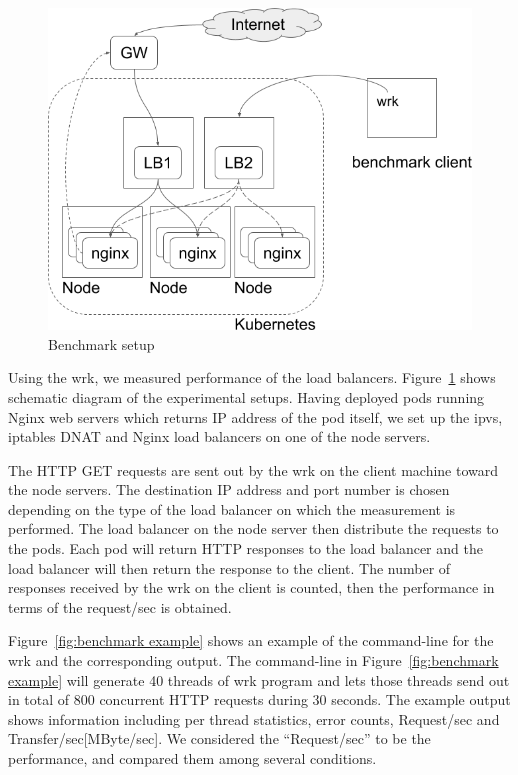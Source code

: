 \begin{figure}
\includegraphics[width=\columnwidth]{Figs/benchmark-schem}
\caption{Benchmark setup}
\label{fig:benchmark-schem}
\end{figure}

Using the wrk, we measured performance of the load balancers.
Figure~\ref{fig:benchmark-schem} shows schematic diagram of the experimental setups.
Having deployed pods running Nginx web servers which returns IP address of the pod itself,
we set up the ipvs, iptables DNAT and Nginx load balancers on one of the node servers. 

The HTTP GET requests are sent out by the wrk on the client machine toward the node servers.
The destination IP address and port number is chosen 
depending on the type of the load balancer on which the measurement is performed.
The load balancer on the node server then distribute the requests to the pods.
Each pod will return HTTP responses to the load balancer and the load balancer will then return the response to the client.
The number of responses received by the wrk on the client is counted, 
then the performance in terms of the request/sec is obtained. 

Figure~\ref{fig:benchmark example} shows an example of the command-line for the wrk and the corresponding output.
The command-line in Figure~\ref{fig:benchmark example} will generate 40 threads of wrk program 
and lets those threads send out in total of 800 concurrent HTTP requests during 30 seconds.
The example output shows information including per thread statistics, error counts, Request/sec and Transfer/sec[MByte/sec].
We considered the \enquote{Request/sec} to be the performance, and compared them among several conditions.

